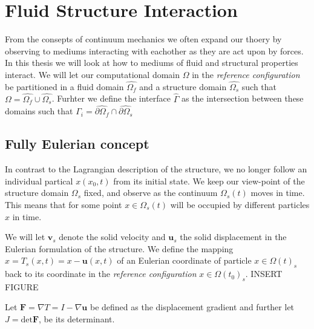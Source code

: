 \section*{Fluid Structure Interaction}
From the consepts of continuum mechanics we often expand our thoery by observing to mediums interacting with eachother as they
are act upon by forces. In this thesis we will look at how to mediums of fluid and structural properties interact. We will let our computational domain $\Omega$ in the \textit{reference configuration} be partitioned in a fluid domain $\hat{\Omega_f}$ and a 
structure domain $\hat{\Omega_s}$ such that
$\Omega = \hat{\Omega_f} \cup \hat{\Omega_s}$. Furhter we define the interface $\hat{\Gamma}$ as the intersection between these domains such that $\Gamma_i = \hat{\partial \Omega_f} \cap \hat{\partial \Omega_s}$ \newline \newline

\subsection{Fully Eulerian concept}
In contrast to the Lagrangian description of the structure, we no longer follow an individual partical $x(x_0, t)$ from its initial state. We keep our view-point of the structure domain $\Omega_s$ fixed, and observe as the continuum $\Omega_s(t)$ moves in time. This means that for some point $x \in \Omega_s(t)$ will be occupied by different particles $\hat{x}$ in time.

We will let $\textbf{v}_s$ denote the solid velocity and $\textbf{u}_s$ the solid displacement in the Eulerian formulation of the structure. We define the mapping $\hat{x} = T_s(x,t) = x - \textbf{u}(x,t)$ of an Eulerian coordinate of particle $x \in \Omega(t)_s$ back to its coordinate in the \textit{reference configuration} $x \in \Omega(t_0)_s$. \newline \newline INSERT FIGURE \newline 

Let $\textbf{F} = \nabla T = I - \nabla \textbf{u}$ be defined as the displacement gradient and further let 
$J = \text{det}\textbf{F}$, be its determinant.


